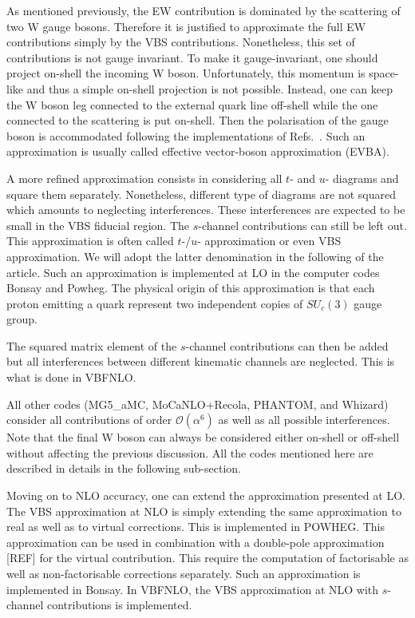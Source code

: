 As mentioned previously, the EW contribution is dominated by the scattering of two W gauge bosons.
Therefore it is justified to approximate the full EW contributions simply by the VBS contributions.
Nonetheless, this set of contributions is not gauge invariant.
To make it gauge-invariant, one should project on-shell the incoming W boson.
Unfortunately, this momentum is space-like and thus a simple on-shell projection is not possible.
Instead, one can keep the W boson leg connected to the external quark line off-shell while the one connected to the scattering is put on-shell.
Then the polarisation of the gauge boson is accommodated following the implementations of Refs.~\cite{Kuss:1995yv,Accomando:2006hq}.
Such an approximation is usually called effective vector-boson approximation (EVBA).

A more refined approximation consists in considering all $t$- and $u$- diagrams and square them separately.
Nonetheless, different type of diagrams are not squared which amounts to neglecting interferences.
These interferences are expected to be small in the VBS fiducial region.
The $s$-channel contributions can still be left out.
This approximation is often called $t$-/$u$- approximation or even VBS approximation.
We will adopt the latter denomination in the following of the article.
Such an approximation is implemented at LO in the computer codes {\sc Bonsay} and {\sc Powheg}.
The physical origin of this approximation is that each proton emitting a quark represent two independent copies of $SU_c\left(3\right)$ gauge group.

The squared matrix element of the $s$-channel contributions can then be added but all interferences between different kinematic channels are neglected.
This is what is done in {\sc VBFNLO}.

All other codes ({\sc MG5\_aMC}, {\sc MoCaNLO+Recola}, {\sc PHANTOM}, and {\sc Whizard}) consider all contributions of order $\mathcal{O}{\left(\alpha^{6}\right)}$ as well as all possible interferences.
Note that the final W boson can always be considered either on-shell or off-shell without affecting the previous discussion.
All the codes mentioned here are described in details in the following sub-section.

Moving on to NLO accuracy, one can extend the approximation presented at LO.
The VBS approximation at NLO is simply extending the same approximation to real as well as to virtual corrections.
This is implemented in {\sc POWHEG}.
This approximation can be used in combination with a double-pole approximation [REF] for the virtual contribution.
This require the computation of factorisable as well as non-factorisable corrections \cite{Dittmaier:2015bfe} separately.
Such an approximation is implemented in {\sc Bonsay}.
In {\sc VBFNLO}, the VBS approximation at NLO with $s$-channel contributions is implemented.

